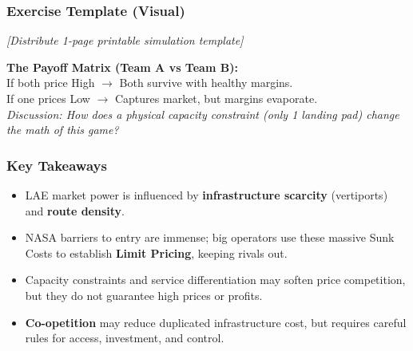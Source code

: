 \documentclass{beamer}
\begin{document}
\begin{frame}[t]
  \frametitle{Exercise Template (Visual)}
  
  \begin{center}
      \textit{[Distribute 1-page printable simulation template]}
      
      \vspace{0.5cm}
      
      \textbf{The Payoff Matrix (Team A vs Team B):} \\
      \vspace{0.2cm}
      If both price High $\rightarrow$ Both survive with healthy margins. \\
      If one prices Low $\rightarrow$ Captures market, but margins evaporate. \\
      \vspace{0.5cm}
      \textit{Discussion: How does a physical capacity constraint (only 1 landing pad) change the math of this game?}
  \end{center}
\end{frame}

\begin{frame}[t]
  \frametitle{Key Takeaways}
  
  \begin{itemize}
    \item LAE market power is influenced by \textbf{infrastructure scarcity} (vertiports) and \textbf{route density}.
    \item NASA barriers to entry are immense; big operators use these massive Sunk Costs to establish \textbf{Limit Pricing}, keeping rivals out.
    \item Capacity constraints and service differentiation may soften price competition, but they do not guarantee high prices or profits.
    \item \textbf{Co-opetition} may reduce duplicated infrastructure cost, but requires careful rules for access, investment, and control.
  \end{itemize}
\end{frame}
\end{document}

